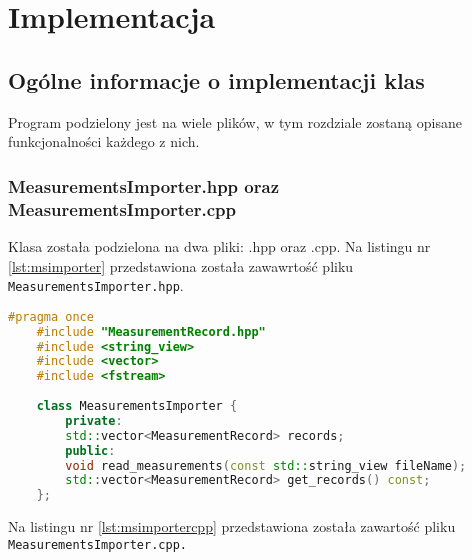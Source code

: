 	\newpage
\section{Implementacja}		%

\subsection{Ogólne informacje o implementacji klas}

Program podzielony jest na wiele plików, w tym rozdziale zostaną opisane funkcjonalności każdego z nich.

\subsubsection{MeasurementsImporter.hpp oraz MeasurementsImporter.cpp}

Klasa została podzielona na dwa pliki: .hpp oraz .cpp. Na listingu nr \ref{lst:msimporter} przedstawiona została zawawrtość pliku \texttt{MeasurementsImporter.hpp}.

\begin{lstlisting}[caption=Zawartość pliku \texttt{MeasurementsImporter.hpp}, label={lst:msimporter}, language=C++]
	#pragma once
	#include "MeasurementRecord.hpp"
	#include <string_view>
	#include <vector>
	#include <fstream>
	
	class MeasurementsImporter {
		private:
		std::vector<MeasurementRecord> records;
		public:
		void read_measurements(const std::string_view fileName); 
		std::vector<MeasurementRecord> get_records() const;
	};
\end{lstlisting}

Na listingu nr \ref{lst:msimportercpp} przedstawiona została zawartość pliku \texttt{MeasurementsImporter.cpp.}

